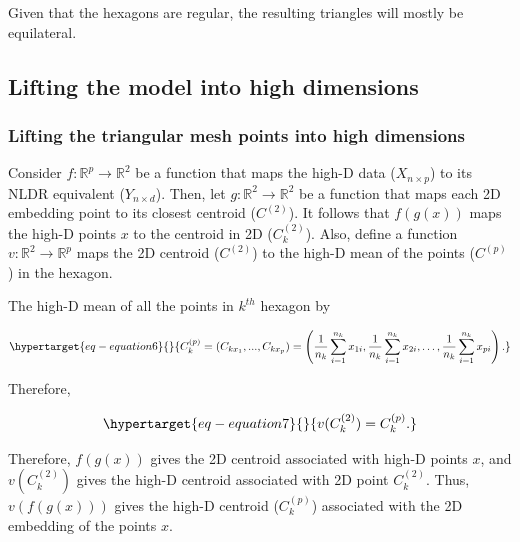 \documentclass[
  12pt]{article}
\begin{document}
Given that the hexagons are regular, the resulting triangles will mostly
be equilateral.

\hypertarget{lifting-the-model-into-high-dimensions}{%
\subsection{Lifting the model into high
dimensions}\label{lifting-the-model-into-high-dimensions}}

\hypertarget{lifting-the-triangular-mesh-points-into-high-dimensions}{%
\subsubsection{Lifting the triangular mesh points into high
dimensions}\label{lifting-the-triangular-mesh-points-into-high-dimensions}}

Consider \(f: \mathbb{R}^p \rightarrow \mathbb{R}^2\) be a function that
maps the high-D data (\(X_{n \times p}\)) to its NLDR equivalent
(\(Y_{n \times d}\)). Then, let
\(g: \mathbb{R}^2 \rightarrow \mathbb{R}^2\) be a function that maps
each 2D embedding point to its closest centroid (\(C^{(2)}\)). It
follows that \(f(g(x))\) maps the high-D points \(x\) to the centroid in
2D (\(C_k^{(2)}\)). Also, define a function
\(v: \mathbb{R}^2 \rightarrow \mathbb{R}^p\) maps the 2D centroid
(\(C^{(2)}\)) to the high-D mean of the points (\(C^{(p)}\)) in the
hexagon.

The high-D mean of all the points in \(k^{th}\) hexagon by

\begin{equation}\protect\hypertarget{eq-equation6}{}{
C_k^{(p)} = (C_{kx_1}, ..., C_{kx_p}) = \left(\frac{1}{n_k} \sum_{i=1}^{n_k} x_{1i}, \frac{1}{n_k} \sum_{i=1}^{n_k} x_{2i}, \dots ,\frac{1}{n_k} \sum_{i=1}^{n_k} x_{pi}\right).
}\label{eq-equation6}\end{equation}

Therefore,

\begin{equation}\protect\hypertarget{eq-equation7}{}{
v(C_k^{(2)}) = C_k^{(p)}.
}\label{eq-equation7}\end{equation}

Therefore, \(f(g(x))\) gives the 2D centroid associated with high-D
points \(x\), and \(v(C_k^{(2)})\) gives the high-D centroid associated
with 2D point \(C_k^{(2)}\). Thus, \(v(f(g(x)))\) gives the high-D
centroid (\(C_k^{(p)}\)) associated with the 2D embedding of the points
\(x\).
\end{document}
